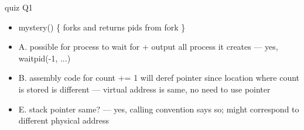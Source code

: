 \begin{frame}{quiz Q1}
    \begin{itemize}
    \item mystery() \{ forks and returns pids from fork \}
    \item A. possible for process to wait for + output all process it creates --- yes, waitpid(-1, ...)
    \item B. assembly code for count += 1 will deref pointer since location where count is stored is different --- virtual address is same, no need to use pointer
    \item E. stack pointer same? --- yes, calling convention says so; might correspond to different physical address
    \end{itemize}
\end{frame}
